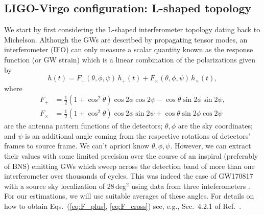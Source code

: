 \documentclass[11pt,a4paper]{article}
\newcommand{\f}{\frac}
\newcommand{\be}{\begin{equation}}
\newcommand{\ee}{\end{equation}}
\begin{document}
\subsection{LIGO-Virgo configuration: L-shaped topology}\label{sec:LIGO_topo}
We start by first considering the L-shaped interferometer topology dating back to Michelson.
Although the GWs are described by propagating tensor modes, an interferometer (IFO) can only measure a scalar quantity
known as the response function (or GW strain)
which is a linear combination of the polarizations given by
%
\be
h(t) = F_+(\theta,\phi,\psi) \,h_+(t)+F_\times(\theta,\phi,\psi)\, h_\times(t) , \label{eq:detector_strain}
\ee
%
where
%
\begin{align}
 F_+ &=\f{1}{2}\left(1+\cos^2\theta\right)\cos2\phi\cos 2\psi-\cos\theta \sin2\phi \sin2\psi \label{eq:F_plus},\\
 F_\times &=\f{1}{2}\left(1+\cos^2\theta\right)\cos2\phi\sin2\psi+\cos\theta \sin2\phi \cos2\psi \label{eq:F_cross}
\end{align}
%
are the antenna pattern functions of the detectors; $\theta,\phi$ are the sky coordinates; and $\psi$ is
an additional angle coming from the respective rotations of detectors' frames to source frame. %
%
We can't apriori know $\theta, \phi,\psi$. However, we can extract their values with some limited precision over the course of an inspiral (preferably of BNS) 
emitting GWs which sweep across the detection band of more than one interferometer over thousands of cycles. This was indeed the case of GW170817
with a source sky localization of 28\,deg$^2$ using data from three inteferometers \cite{GW170817}. 
For our estimations, we will use suitable averages of these angles.
For details on how to obtain Eqs.~(\ref{eq:F_plus}, \ref{eq:F_cross}) see, e.g., Sec.~4.2.1 of Ref.~\cite{SchutzLRR}.
\end{document}
